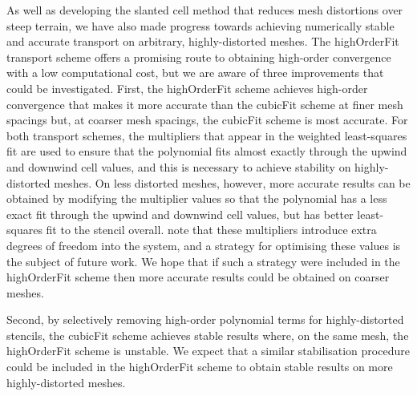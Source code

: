 As well as developing the slanted cell method that reduces mesh distortions over steep terrain, we have also made progress towards achieving numerically stable and accurate transport on arbitrary, highly-distorted meshes.
The highOrderFit transport scheme offers a promising route to obtaining high-order convergence with a low computational cost, but we are aware of three improvements that could be investigated.
First, the highOrderFit scheme achieves high-order convergence that makes it more accurate than the cubicFit scheme at finer mesh spacings but, at coarser mesh spacings, the cubicFit scheme is most accurate.
For both transport schemes, the multipliers that appear in the weighted least-squares fit are used to ensure that the polynomial fits almost exactly through the upwind and downwind cell values, and this is necessary to achieve stability on highly-distorted meshes.
On less distorted meshes, however, more accurate results can be obtained by modifying the multiplier values so that the polynomial has a less exact fit through the upwind and downwind cell values, but has better least-squares fit to the stencil overall.
\citet{devendran2017} note that these multipliers introduce extra degrees of freedom into the system, and a strategy for optimising these values is the subject of future work.
We hope that if such a strategy were included in the highOrderFit scheme then more accurate results could be obtained on coarser meshes.

Second, by selectively removing high-order polynomial terms for highly-distorted stencils, the cubicFit scheme achieves stable results where, on the same mesh, the highOrderFit scheme is unstable.
We expect that a similar stabilisation procedure could be included in the highOrderFit scheme to obtain stable results on more highly-distorted meshes.



